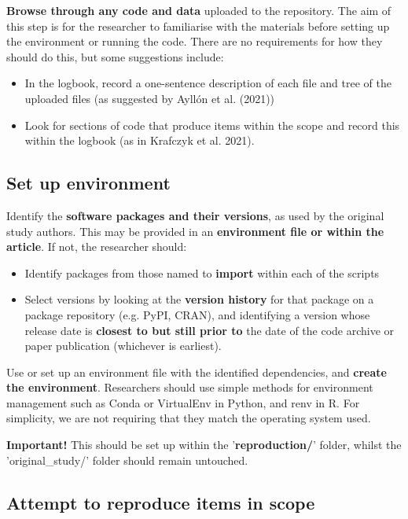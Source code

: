 \textbf{Browse through any code and data} uploaded to the repository. The aim of this step is for the researcher to familiarise with the materials before setting up the environment or running the code. There are no requirements for how they should do this, but some suggestions include:
\begin{itemize}
    \item In the logbook, record a one-sentence description of each file and tree of the uploaded files (as suggested by Ayllón et al. (2021)\autocite{ayllon_keeping_2021})
    \item Look for sections of code that produce items within the scope and record this within the logbook (as in Krafczyk et al. 2021\autocite{krafczyk_learning_2021}).
\end{itemize}

\vspace{0.5cm}
\subsection{Set up environment}

Identify the \textbf{software packages and their versions}, as used by the original study authors. This may be provided in an \textbf{environment file or within the article}. If not, the researcher should:
\begin{itemize}
    \item Identify packages from those named to \textbf{import} within each of the scripts
    \item Select versions by looking at the \textbf{version history} for that package on a package repository (e.g. PyPI, CRAN), and identifying a version whose release date is \textbf{closest to but still prior to} the date of the code archive or paper publication (whichever is earliest).
\end{itemize}

Use or set up an environment file with the identified dependencies, and \textbf{create the environment}. Researchers should use simple methods for environment management such as Conda or VirtualEnv in Python, and renv in R. For simplicity, we are not requiring that they match the operating system used.

\textbf{Important!} This should be set up within the '\textbf{reproduction/}' folder, whilst the 'original\_study/' folder should remain untouched.

\vspace{0.5cm}
\subsection{Attempt to reproduce items in scope}

